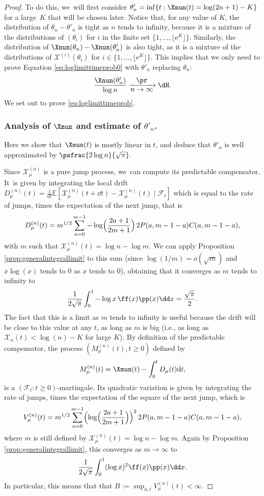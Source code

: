 \begin{proof}
To do this, we~will first consider $\theta'_n=\inf\{t: \Xmun(t) = \log (2n+1)-K\}$ for a large~$K$ that will be chosen later. Notice that, for any value of $K$, the distribution of $\theta_n-\theta'_n$ is tight as $n$ tends to infinity, because it is a mixture of the distributions of $(\theta_i)$ for $i$ in the finite set $\{1,\ldots,\lfloor \mathrm{e}^{K}\rfloor\}$. Similarly, the distribution of $\Xnun(\theta_n)-\Xnun(\theta'_n)$ is also tight, as it is a mixture of the distributions of $\mathcal{X}^{(i)}(\theta_i)$ for $i\in \{1,\ldots,\lfloor \mathrm{e}^{K}\rfloor\}$. This implies that we only need to prove Equation \eqref{eq:loglimittimeprob0} with $\theta'_n$ replacing $\theta_n$:\vspace*{-3pt}
\begin{equation}\label{eq:loglimittimeprob}
\frac{ \Xnun(\theta'_n)}{\log n} \xrightarrow[\textstyle n\to\infty]{\textstyle\pr} \dH.
\end{equation}
We set out to prove \eqref{eq:loglimittimeprob}.

\subsubsection*{Analysis of $\Xmun$ and estimate of $\theta'_n$.} Here we show that $\Xmun(t)$ is mostly linear in $t$, and deduce that $\theta'_n$ is well approximated by $\psfrac{2\log n}{\sqrt{\pi}}.
$

Since $\mathcal{X}^{(n)}_{\mu}$ is a pure jump process, we~can compute its predictable compensator. It~is given by integrating the local drift $D_\mu^{(n)}(t)=\frac{1}{ \mathrm{d}t} \mathbb{E}[\mathcal{X}^{(n)}_{\mu}(t+\dd t)-\mathcal{X}^{(n)}_{\mu}(t)\mid \mathcal{F}_t]$ which is equal to the rate of jumps, times the expectation of the next jump, that is
\[
D_{\mu}^{(n)}(t)=m^{1/2}\sum_{a=0}^{m-1} -\log\Bigl(\frac{2a+1}{2m+1}\Bigr)\, 2P(a,m-1-a)C(a,m-1-a),
\]
with $m$ such that $\mathcal{X}^{(n)}_{\mu}(t)=\log n - \log m$.
We can apply Proposition \ref{prop:generalintegrallimit} to this sum (since $\log (1/m)=o(\sqrt{m})$ and $x\log(x)$ tends to $0$ as $x$ tends to $0$), obtaining that it converges as $m$ tends to infinity to
\[
\frac1{2\sqrt{\pi}}\int_0^1 -\log x \, \ff(x) \pp(x)\dd x=\frac{\sqrt{\pi}}{2}.
\]
The fact that this is a limit as $m$ tends to infinity is useful because the drift will be close to this value at any $t$, as long as $m$ is big (i.e., as long as $\mathcal{X}_n(t)< \log(n)-K$ for large $K$). By definition of the predictable compensator, the process $(M^{(n)}_{\mu}(t),t\geq 0)$ defined by
\[
M^{(n)}_{\mu}(t)=\Xmun(t)-\int_0^t D_{\mu}(t)\mathrm dt,
\]
is a $(\mathcal{F}_t : t \geq 0)$-martingale. Its quadratic variation is given by integrating the rate of jumps, times the expectation of the square of the next jump, which is
\[
V_{\mu}^{(n)}(t)=m^{1/2}\sum_{a=0}^{m-1} \Bigl(\log\Bigl(\frac{2a+1}{2m+1}\Bigr)\Bigr)^2\, 2P(a,m-1-a)C(a,m-1-a),
\]
where $m$ is still defined by $\mathcal{X}^{(n)}_{\mu}(t)=\log n - \log m$. Again by Proposition \ref{prop:generalintegrallimit}, this converges as $m \to \infty$ to
\[
\frac1{2\sqrt{\pi}}\int_0^1 (\log x)^2\ff(x)\pp(x)\dd x.
\]
In particular, this means that that $B:=\sup_{n,t} V^{(n)}_{\mu}(t)<\infty$.


\end{proof}
